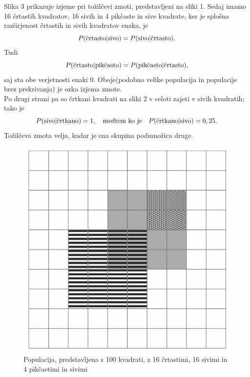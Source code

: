\documentclass[12pt,a4paper]{amsart}
\theoremstyle{definition} %
\theoremstyle{plain} %
\begin{document}
Slika 3 prikazuje izjeme pri tožilčevi zmoti, predstavljeni na sliki 1. Sedaj imamo 16 črtastih kvadratov, 16 sivih in 4 pikčaste in sive kvadrate, ker je splošna
razširjenost črtastih in sivih kvadratov enaka, je
\[
   P(\text{črtasto} \lvert \text{sivo}) = P(\text{sivo} \lvert \text{črtasto}). \vspace{2mm}
\]
Tudi
\[
   P(\text{črtasto} \lvert \text{pikčasto}) = P(\text{pikčasto} \lvert \text{črtasto}), \vspace{2mm}
\]
saj sta obe verjetnosti enaki $0$. Oboje(podobno velike populacija in populacije brez prekrivanja) je ozka izjema zmote. \\
Po drugi strani pa so črtkani kvadrati na sliki 2 v celoti zajeti v sivih kvadratih; tako je
\[
   P(\text{sivo} \lvert \text{črtkano}) = 1, \quad \text{medtem ko je} \quad P(\text{črtkano} \lvert \text{sivo}) = 0,25. \vspace{2mm}
\]
Tožilčeva zmota velja, kadar je ena skupina podmnožica druge. 

\begin{figure}[!ht]\label{fig:slika2}
   \centering
   \includegraphics[scale=0.45]{slika2.png}
   \caption{Populacija, predstavljena s 100 kvadrati, z 16 črtastimi, 16 sivimi in 4 pikčastimi in sivimi}\vspace{2mm}
\end{figure}
\pagebreak
\end{document}
